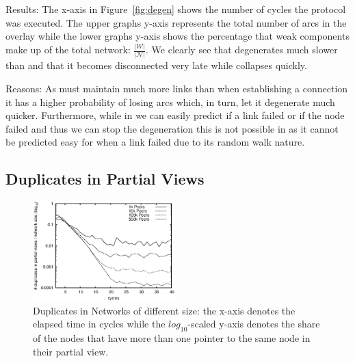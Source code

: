 \begin{asparadesc}
\item[Results:]
    The x-axis in Figure~\ref{fig:degen} shows the number of cycles the protocol was
    executed.
    The upper graphs y-axis represents the total number of arcs in the
    overlay while the lower graphs y-axis shows the percentage that weak components
    make up of the total network: $\frac{|\mathcal{W}|}{|\mathcal{N}|}$.
    We clearly see that \SCAMPLON{} degenerates much slower than \SCAMP{} and that
    it becomes disconnected very late while \SCAMP{} collapses quickly.

\item[Reasons:]
    As \SCAMP{} must maintain much more links than \SCAMPLON{} when establishing a
    connection it has a higher probability of losing arcs which, in turn, let it
    degenerate much quicker.
    Furthermore, while in \SCAMPLON{} we can easily predict if a link failed or if
    the node failed and thus we can stop the degeneration this is not possible in
    \SCAMP{} as it cannot be predicted easy for when a link failed due to its
    random walk nature.

\end{asparadesc}

\subsection{Duplicates in Partial Views}

\begin{figure}
  \centering \includegraphics[width=0.49\textwidth]{img/dupl.eps}
  \caption{\label{fig:dupl}
  Duplicates in Networks of different size: the x-axis denotes the elapsed time
  in cycles while the $log_{10}$-scaled y-axis denotes the share of the nodes that
  have more than one pointer to the same node in their partial view.
  } \end{figure}

